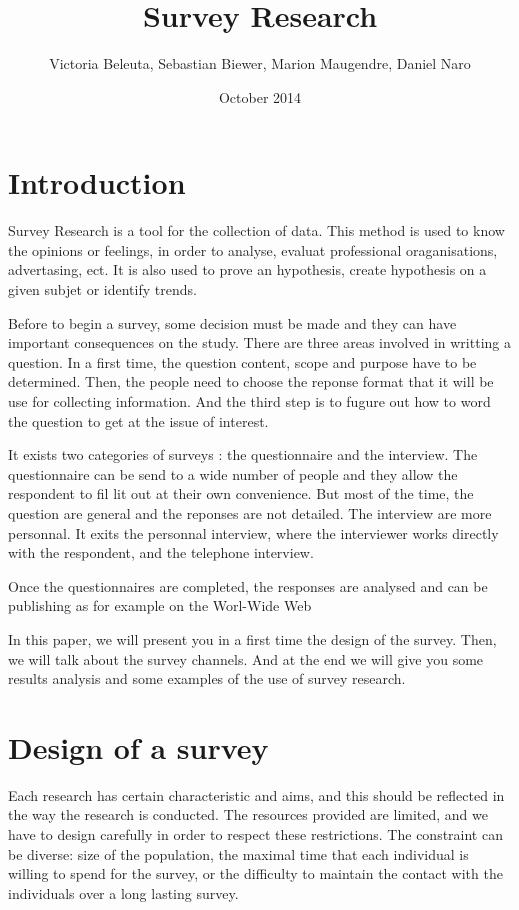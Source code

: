 \documentclass{report}
\title{Survey Research}
\author{Victoria Beleuta, Sebastian Biewer, Marion Maugendre, Daniel Naro}
\date{October 2014}
\begin{document}
\maketitle
\tableofcontents

\chapter{Introduction}
Survey Research is a tool for the collection of data. This method is used to know the opinions or feelings, in order to analyse, evaluat professional oraganisations, advertasing, ect. It is also used to prove an hypothesis, create hypothesis on a given subjet or identify trends.

Before to begin a survey, some decision must be made and they can have important consequences on the study. There are three areas involved in writting a question. In a first time, the question content, scope and purpose have to be determined. Then, the people need to choose the reponse format that it will be use for collecting information. And the third step is to fugure out how to word the question to get at the issue of interest. 

It exists two categories of surveys : the questionnaire and the interview. The questionnaire can be send to a wide number of people and they allow the respondent to fil lit out at their own convenience. But most of the time, the question are general and the reponses are not detailed. The interview are more personnal. It exits the personnal interview, where the interviewer works directly with the respondent, and the telephone interview.

Once the questionnaires are completed, the responses are analysed and can be publishing as for example on the Worl-Wide Web \cite{intro}

In this paper, we will present you in a first time the design of the survey. Then, we will talk about the survey channels. And at the end we will give you some results analysis and some examples of the use of survey research.
\chapter{Design of a survey}
Each research has certain characteristic and aims, and this should be reflected in the way the research is conducted. The resources provided are limited, and we have to design carefully in order to respect these restrictions. The constraint can be diverse: size of the population, the maximal time that each individual is willing to spend for the survey, or the difficulty to maintain the contact with the individuals over a long lasting survey.
\end{document}
